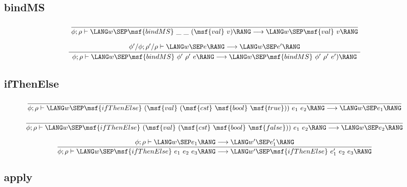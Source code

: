\documentclass{article}
\begin{document}
\subsection{bindMS}

\begin{gather}
  \frac{}{ \phi; \rho \vdash \LANG w \SEP \msf{bindMS} \ \_ \ \_
    \ (\msf{val} \ v) \RANG \longrightarrow \LANG w \SEP \msf{val} \ v
    \RANG }
\end{gather}

\begin{gather}
  \frac{ \begin{array}{ll} \phi' / \phi; \rho' / \rho \vdash \LANG w
      \SEP e \RANG \longrightarrow \LANG w \SEP e' \RANG \end{array} }
       { \begin{array}{ll} \phi; \rho \vdash \LANG w \SEP \msf{bindMS}
           \ \phi' \ \rho' \ e \RANG \longrightarrow \LANG w \SEP
           \msf{bindMS} \ \phi' \ \rho' \ e') \RANG \end{array} }
\end{gather}



\subsection{ifThenElse}

\begin{gather}
  \frac{}{ \phi; \rho \vdash \LANG w \SEP \msf{ifThenElse}
    \ (\msf{val} \ (\msf{cst} \ \msf{bool} \ \msf{true})) \ e_1 \ e_2
    \RANG \longrightarrow \LANG w \SEP e_1 \RANG }
\end{gather}

\begin{gather}
  \frac{}{ \phi; \rho \vdash \LANG w \SEP \msf{ifThenElse}
    \ (\msf{val} \ (\msf{cst} \ \msf{bool} \ \msf{false})) \ e_1 \ e_2
    \RANG \longrightarrow \LANG w \SEP e_2 \RANG }
\end{gather}


\begin{gather}
  \frac{ \phi; \rho \vdash \LANG w \SEP e_1 \RANG \longrightarrow
    \LANG w' \SEP e'_1 \RANG }{ \phi; \rho \vdash \LANG w \SEP
    \msf{ifThenElse} \ e_1 \ e_2 \ e_3 \RANG \longrightarrow \LANG w'
    \SEP \msf{ifThenElse} \ e'_1 \ e_2 \ e_3 \RANG }
\end{gather}




\subsection{apply}
\end{document}

